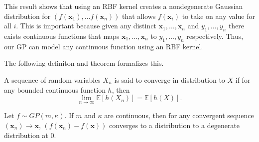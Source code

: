 This result shows that using an RBF kernel creates a nondegenerate Gaussian distribution
for $(f(\mathbf{x}_1), \ldots f(\mathbf{x}_n))$ that allows $f(\mathbf{x}_i)$ to take on any value for all $i$.
This is important because given any distinct $\mathbf{x}_1, \ldots, \mathbf{x}_n$ and $y_1, \ldots, y_n$
there exists continuous functions that maps $\mathbf{x}_1, \ldots, \mathbf{x}_n$ to $y_1, \ldots, y_n$ respectively.
Thus, our GP can model any continuous function using an RBF kernel.


The following definiton and theorem formalizes this.

\begin{definition}\label{def:cvg-dst}
    A sequence of random variables $X_n$ is said to converge in distribution to $X$
    if for any bounded continuous function $h$, then
    \begin{equation*}
        \lim_{n\to \infty} \mathbb{E}[h(X_n)] = \mathbb{E}[h(X)].
    \end{equation*}
\end{definition}

\begin{theorem}
    Let $f \sim GP(m, \kappa)$.
    If $m$ and $\kappa$ are continuous, then for any convergent sequence $(\mathbf{x}_n) \to \mathbf{x}$,
    $(f(\mathbf{x}_n) - f(\mathbf{x}))$ converges to a distribution to a degenerate distribution at 0.
\end{theorem}


